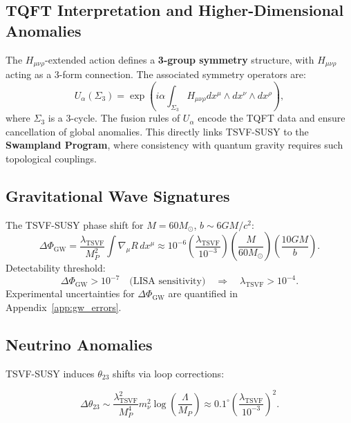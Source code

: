 \documentclass[12pt, onecolumn]{article}
\theoremstyle{definition}
\newcommand{\tsvf}{\lambda_{\mathrm{TSVF}}}
\numberwithin{equation}{section}
\begin{document}
\subsection{TQFT Interpretation and Higher-Dimensional Anomalies}
The \(H_{\mu\nu\rho}\)-extended action defines a \textbf{3-group symmetry} structure, with \(H_{\mu\nu\rho}\) acting as a 3-form connection. The associated symmetry operators are:
\begin{equation}
U_\alpha(\Sigma_3) = \exp\left(i \alpha \int_{\Sigma_3} H_{\mu\nu\rho} dx^\mu \wedge dx^\nu \wedge dx^\rho\right),
\end{equation}
where \(\Sigma_3\) is a 3-cycle. The fusion rules of \(U_\alpha\) encode the TQFT data and ensure cancellation of global anomalies. This directly links TSVF-SUSY to the \textbf{Swampland Program}, where consistency with quantum gravity requires such topological couplings.

\subsection{Gravitational Wave Signatures}  
\label{subsec:gw}

The TSVF-SUSY phase shift for \(M = 60M_\odot\), \(b \sim 6GM/c^2\):  
\begin{equation}
\Delta\Phi_{\text{GW}} = \frac{\tsvf}{M_P^2} \int \nabla_\mu R \, dx^\mu \approx 10^{-6} \left(\frac{\tsvf}{10^{-3}}\right)\left(\frac{M}{60M_\odot}\right)\left(\frac{10GM}{b}\right).
\end{equation}  
Detectability threshold:  
\begin{equation}
\Delta\Phi_{\text{GW}} > 10^{-7} \quad \text{(LISA sensitivity)} \quad \Rightarrow \quad \tsvf > 10^{-4}.
\end{equation}
Experimental uncertainties for \(\Delta\Phi_{\text{GW}}\) are quantified in Appendix~\ref{app:gw_errors}.

\subsection{Neutrino Anomalies}

TSVF-SUSY induces \( \theta_{23} \) shifts via loop corrections:

\begin{equation}
\Delta \theta_{23} \sim \frac{\tsvf^2}{M_P^4} m_{\nu}^2 \log \left( \frac{\Lambda}{M_P} \right) \approx 0.1^\circ \left( \frac{\tsvf}{10^{-3}} \right)^2.
\end{equation}
\end{document}
